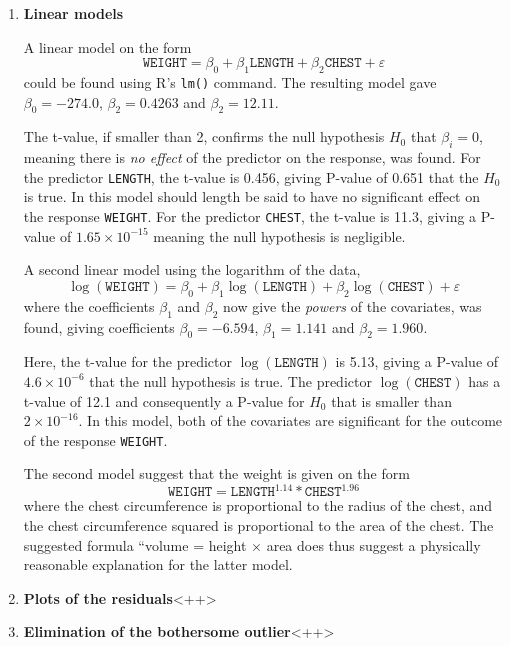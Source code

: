 \documentclass[a4paper,11pt]{article}
\begin{document}
\begin{enumerate}[label=\alph*)]
    \item \textbf{Linear models}
        
        A linear model on the form
        \begin{equation}
        \mathtt{WEIGHT} = \beta_0 + \beta_1 \mathtt{LENGTH} + \beta_2 \mathtt{CHEST} + \varepsilon
            \label{eq:linmod1}
        \end{equation}
        could be found using R's \texttt{lm()} command. The resulting model gave $\beta_0 = -274.0$, $\beta_2 = 0.4263$ and $\beta_2 = 12.11$.

        The t-value, if smaller than 2, confirms the null hypothesis $H_0$ that $\beta_i = 0$, meaning there is \textit{no effect} of the predictor on the  response, was found. For the predictor \texttt{LENGTH}, the t-value is 0.456, giving P-value of 0.651 that the $H_0$ is true. In this model should length be said to have no significant effect on the response \texttt{WEIGHT}. For the predictor \texttt{CHEST}, the t-value is 11.3, giving a P-value of $1.65 \times 10^{-15}$ meaning the null hypothesis is negligible.

        A second linear model using the logarithm of the data,
        \begin{equation}
        \log(\mathtt{WEIGHT}) = \beta_0 + \beta_1 \log(\mathtt{LENGTH}) + \beta_2 \log(\mathtt{CHEST}) + \varepsilon
            \label{eq:linmod2}
        \end{equation}
        where the coefficients $\beta_1$ and $\beta_2$ now give the \textit{powers} of the covariates, was found, giving coefficients $\beta_0 = -6.594$, $\beta_1 = 1.141$ and $\beta_2 = 1.960$.

        Here, the t-value for the predictor $\log(\mathtt{LENGTH})$ is 5.13, giving a P-value of $4.6\times10^{-6}$ that the null hypothesis is true. The predictor $\log(\mathtt{CHEST})$ has a t-value of 12.1 and consequently a P-value for $H_0$ that is smaller than $2\times10^{-16}$. In this model, both of the covariates are significant for the outcome of the response \texttt{WEIGHT}. 

        The second model suggest that the weight is given on the form
        \begin{equation}
            \mathtt{WEIGHT} = \mathtt{LENGTH}^{1.14} * \mathtt{CHEST}^{1.96}
            \label{eq:weightfunc1}
        \end{equation}
        where the chest circumference is proportional to the radius of the chest, and the chest circumference squared is proportional to the area of the chest. The suggested formula ``volume = height $\times$ area does thus suggest a physically reasonable explanation for the latter model.

    \item \textbf{Plots of the residuals}<++>

    \item \textbf{Elimination of the bothersome outlier}<++>
\end{enumerate}
\end{document}
